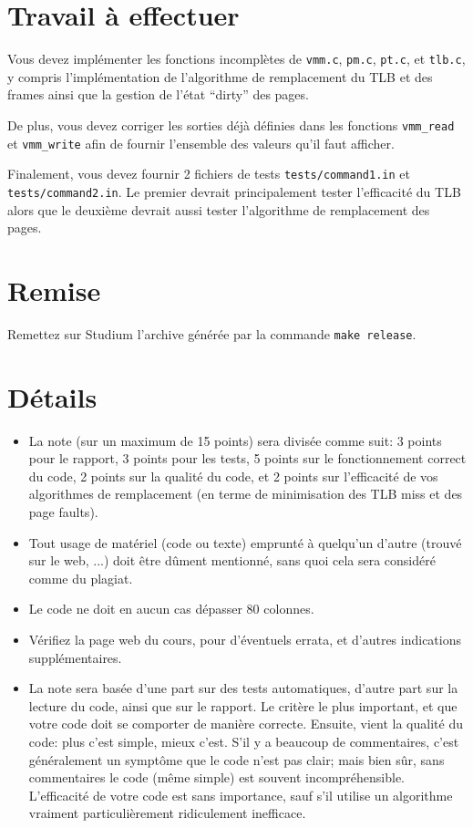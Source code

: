 \documentclass{article}
\begin{document}
\section{Travail à effectuer}

Vous devez implémenter les fonctions incomplètes de \texttt{vmm.c},
\texttt{pm.c}, \texttt{pt.c}, et \texttt{tlb.c}, y compris l'implémentation
de l'algorithme de remplacement du TLB et des frames ainsi que la gestion de
l'état ``dirty'' des pages.

De plus, vous devez corriger les sorties déjà définies dans les fonctions
\texttt{vmm\_read} et \texttt{vmm\_write} afin de fournir l'ensemble des
valeurs qu'il faut afficher.  

Finalement, vous devez fournir 2 fichiers de tests
\texttt{tests/command1.in} et \texttt{tests/command2.in}.  Le premier
devrait principalement tester l'efficacité du TLB alors que le deuxième
devrait aussi tester l'algorithme de remplacement des pages.

\section{Remise}

Remettez sur Studium l'archive générée par la commande \texttt{make release}.


\section{Détails}

\begin{itemize}
\item La note (sur un maximum de 15 points) sera divisée comme suit:
  3 points pour le rapport, 3 points pour les tests, 5 points sur le
  fonctionnement correct du code, 2 points sur la qualité du code, et
  2 points sur l'efficacité de vos algorithmes de remplacement (en terme de
  minimisation des TLB miss et des page faults).
\item Tout usage de matériel (code ou texte) emprunté à quelqu'un d'autre
  (trouvé sur le web, ...) doit être dûment mentionné, sans quoi cela sera
  considéré comme du plagiat.
\item Le code ne doit en aucun cas dépasser 80 colonnes.
\item Vérifiez la page web du cours, pour d'éventuels errata, et d'autres
  indications supplémentaires.
\item La note sera basée d'une part sur des tests automatiques, d'autre part
  sur la lecture du code, ainsi que sur le rapport.  Le critère le plus
  important, et que votre code doit se comporter de manière correcte.
  Ensuite, vient la qualité du code: plus c'est simple, mieux c'est.
  S'il y a beaucoup de commentaires, c'est généralement un symptôme que le
  code n'est pas clair; mais bien sûr, sans commentaires le code (même
  simple) est souvent incompréhensible.  L'efficacité de votre code est sans
  importance, sauf s'il utilise un algorithme vraiment particulièrement
  ridiculement inefficace.
\end{itemize}
\end{document}
